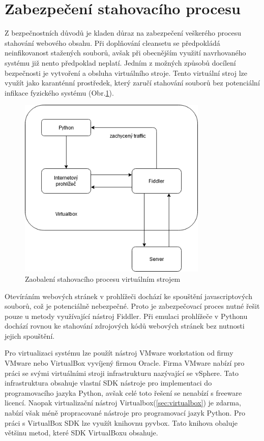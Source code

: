 \documentclass[thesis=M,czech,hidelinks]{FITthesis}[2013/05/06]
\begin{document}
\section{Zabezpečení stahovacího procesu}\label{sec:zabezpeceni}
Z bezpečnostních důvodů je kladen důraz na zabezpečení veškerého procesu stahování webového obsahu. Při doplňování cleansetu se předpokládá neinfikovanost stažených souborů, avšak při obecnějším využití navrhovaného systému již nento předpoklad neplatí. Jedním z možných způsobů docílení bezpečnosti je vytvoření a obsluha virtuálního stroje. Tento virtuální stroj lze využít jako karanténní prostředek, který zaručí stahování souborů bez potenciální infikace fyzického systému (Obr.\ref{fig:virtualbox}).

\begin{figure}[h]
	\centering
	\includegraphics[width=9cm]{pictures/virtualbox.png}
	\caption{Zaobalení stahovacího procesu virtuálním strojem}
	\label{fig:virtualbox}
\end{figure}

Otevíráním webových stránek v prohlížeči dochází ke spouštění javascriptových souborů, což je potenciálně nebezpečné. Proto je zabezpečovací proces nutné řešit pouze u metody využívající nástroj Fiddler. Při emulaci prohlížeče v Pythonu dochází rovnou ke stahování zdrojových kódů webových stránek bez nutnosti jejich spouštění.

Pro virtualizaci systému lze použít nástroj VMware workstation od firmy VMware nebo VirtualBox vyvíjený firmou Oracle. Firma VMware nabízí pro práci se svými virtuálními stroji infrastrukturu nazývající se vSphere. Tato infrastruktura obsahuje vlastní SDK nástroje pro implementaci do programovacího jazyka Python\cite{vmware}, avšak celé toto řešení se nenabízí s freeware licencí. Naopak virtualizační nástroj Virtualbox(\ref{sec:virtualbox}) je zdarma, nabízí však méně propracované nástroje pro programovací jazyk Python. Pro práci s VirtualBox SDK lze využít knihovnu pyvbox\cite{pyvbox}. Tato knihova obaluje většinu metod, které SDK VirtualBoxu obsahuje. 
\end{document}

